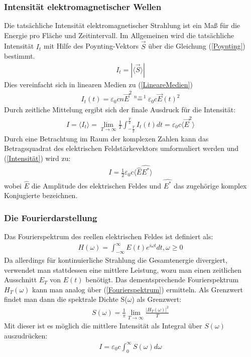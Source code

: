 \documentclass[german,  %
parskip=full,  %
]{scrartcl}
\begin{document}
\subsubsection{Intensität elektromagnetischer Wellen}
Die tatsächliche Intensität elektromagnetischer Strahlung ist ein Maß für die Energie pro Fläche und Zeitintervall. Im Allgemeinen wird die tatsächliche Intensität $I_t$ mit Hilfe des Poynting-Vektors $\vec{S}$ über die Gleichung (\ref{Poynting}) bestimmt.
\begin{align}
\label{Poynting} I_t=| \langle \vec{S} \rangle |
\end{align}
Dies vereinfacht sich in linearen Medien zu (\ref{LineareMedien})
\begin{align}
\label{LineareMedien} I_t(t)= \varepsilon_0 c n \vec{E}^2 \stackrel{n=1}{=} \varepsilon_0 c \vec{E}(t)^2
\end{align}
Durch zeitliche Mittelung ergibt sich der finale Ausdruck für die Intensität:
\begin{align}
\label{Intensität} I = \langle I_t \rangle = \lim\limits_{T \rightarrow \infty} \frac{1}{T} \int_{- \frac{T}{2}}^{\frac{T}{2}} I_t(t) dt = \varepsilon_0 c  \langle \vec{E}^2 \rangle
\end{align}
Durch eine Betrachtung im Raum der komplexen Zahlen kann das Betragsquadrat des elektrischen Feldstärkevektors umformuliert werden und (\ref{Intensität}) wird zu:
\begin{align}
\label{Intensität2} I = \frac{1}{2} \varepsilon_0 c \langle \hat{E} \hat{E^*} \rangle
\end{align}
wobei $\hat{E}$ die Amplitude des elektrischen Feldes und $\hat{E^*}$ das zugehörige komplex Konjugierte bezeichnen.

\subsubsection{Die Fourierdarstellung}
Das Fourierspektrum des reellen elektrischen Feldes ist definiert als:
\begin{align}
\label{Fourierspektrum} H(\omega) = \int_{- \infty}^{\infty}  E(t) e^{i\omega t}  dt, \omega \geq 0
\end{align}
Da allerdings für kontinuierliche Strahlung die Gesamtenergie divergiert, verwendet man stattdessen eine mittlere Leistung, wozu man einen zeitlichen Ausschnitt $E_T$ von $E(t)$ benötigt. Das dementsprechende Fourierspektrum $H_T(\omega)$ kann man analog über (\ref{Fourierspektrum}) ermitteln. Als Grenzwert findet man dann die spektrale Dichte S($\omega$) als Grenzwert:
\begin{align}
\label{SpektraleDichte} S(\omega)= \frac{1}{\pi} \lim\limits_{T \rightarrow \infty} \frac{|H_T(\omega)|^2}{T}
\end{align}
Mit dieser ist es möglich die mittlere Intensität als Integral über $S(\omega)$ auszudrücken:
\begin{align}
\label{Intensität3} I=\varepsilon_0 c \int_{0}^{\infty} S(\omega) d\omega
\end{align}
\end{document}
